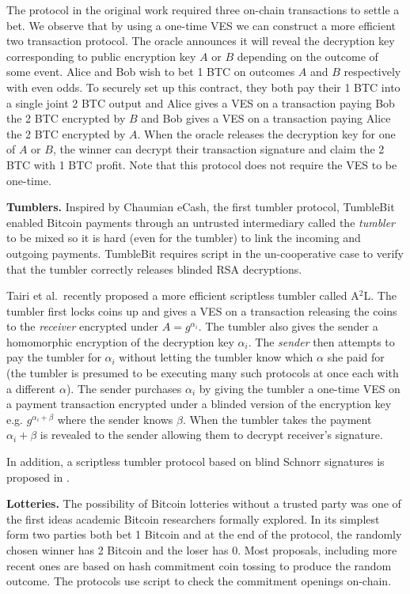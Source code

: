 The protocol in the original work required three on-chain transactions to settle a bet. We observe that by using a one-time VES we can construct a more efficient two transaction protocol. %
The oracle announces it will reveal the decryption key corresponding to public encryption key $A$ or $B$ depending on the outcome of some event. Alice and Bob wish to bet 1 BTC on outcomes $A$ and $B$ respectively with even odds. To securely set up this contract, they both pay their 1 BTC into a single joint 2 BTC output and Alice gives a VES on a transaction paying Bob the 2 BTC encrypted by $B$ and Bob gives a VES on a transaction paying Alice the 2 BTC encrypted by $A$. When the oracle releases the decryption key for one of $A$ or $B$, the winner can decrypt their transaction signature and claim the 2 BTC with 1 BTC profit. Note that this protocol does not require the VES to be one-time.

\hfill \break \textbf{Tumblers.}  Inspired by Chaumian eCash\cite{chaum1983blind}, the first tumbler protocol, TumbleBit\cite{tumblebit} enabled Bitcoin payments through an untrusted intermediary called the \emph{tumbler} to be mixed so it is hard (even for the tumbler) to link the incoming and outgoing payments. TumbleBit requires script in the un-cooperative case to verify that the tumbler correctly releases blinded RSA decryptions.

Tairi et al.\ recently proposed a more efficient scriptless tumbler called A$^2$L\cite{cryptoeprint:2019:589}. The tumbler first locks coins up and gives a VES on a transaction releasing the coins to the \emph{receiver} encrypted under $A = g^{\alpha_i}$. The tumbler also gives the sender a homomorphic encryption of the decryption key $\alpha_i$. The \emph{sender} then attempts to pay the tumbler for $\alpha_i$ without letting the tumbler know which $\alpha$ she paid for (the tumbler is presumed to be executing many such protocols at once each with a different $\alpha$). The sender purchases $\alpha_i$ by giving the tumbler a one-time VES on a payment transaction encrypted under a blinded version of the encryption key e.g. $g^{\alpha_i + \beta}$ where the sender knows $\beta$. When the tumbler takes the payment $\alpha_i + \beta$ is revealed to the sender allowing them to decrypt receiver's signature.

In addition, a scriptless tumbler protocol based on blind Schnorr signatures is proposed in \cite{blind-tumbler}.

\hfill \break  \textbf{Lotteries.} The possibility of Bitcoin lotteries without a trusted party\cite{bitcoin_talk} was one of the first ideas academic Bitcoin researchers formally explored\cite{bentov_how_to_use_bitcoin}\cite{andrychowicz_lottery}. In its simplest form two parties both bet 1 Bitcoin and at the end of the protocol, the randomly chosen winner has 2 Bitcoin and the loser has 0. Most proposals, including more recent ones\cite{bartoletti_lottery}\cite{DBLP:journals/corr/MillerB16} are based on hash commitment coin tossing to produce the random outcome. The protocols use script to check the commitment openings on-chain.

